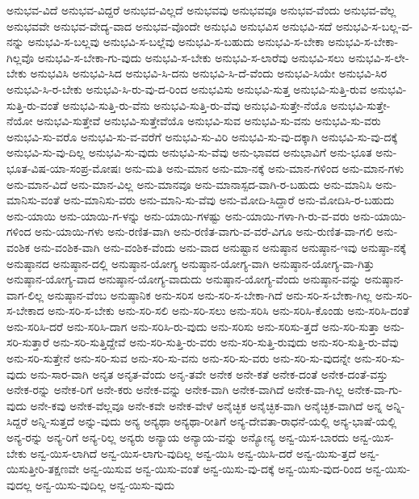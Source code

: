 {ಅನುಭವ-ವಿದೆ
ಅನುಭವ-ವಿದ್ದರೆ
ಅನುಭವ-ವಿಲ್ಲದೆ
ಅನುಭವವು
ಅನುಭವವೂ
ಅನುಭವ-ವೆಂದು
ಅನುಭವ-ವೆಲ್ಲ
ಅನುಭವವೇ
ಅನುಭವ-ವೇದ್ಯ-ವಾದ
ಅನುಭವ-ವೊಂದೇ
ಅನುಭವಿ
ಅನುಭವಿಸ
ಅನುಭವಿ-ಸದೆ
ಅನುಭವಿ-ಸ-ಬಲ್ಲ-ವ-ನನ್ನು
ಅನುಭವಿ-ಸ-ಬಲ್ಲವು
ಅನುಭವಿ-ಸ-ಬಲ್ಲೆವು
ಅನುಭವಿ-ಸ-ಬಹುದು
ಅನುಭವಿ-ಸ-ಬೇಕಾ
ಅನುಭವಿ-ಸ-ಬೇಕಾ-ಗಿಲ್ಲವೊ
ಅನುಭವಿ-ಸ-ಬೇಕಾ-ಗು-ವುದು
ಅನುಭವಿ-ಸ-ಬೇಕು
ಅನುಭವಿ-ಸ-ಲಾರೆವು
ಅನುಭವಿ-ಸಲು
ಅನುಭವಿ-ಸ-ಲೇ-ಬೇಕು
ಅನುಭವಿಸಿ
ಅನುಭವಿ-ಸಿದ
ಅನುಭವಿ-ಸಿ-ದನು
ಅನುಭವಿ-ಸಿ-ದೆ-ವೆಂದು
ಅನುಭವಿ-ಸಿಯೇ
ಅನುಭವಿ-ಸಿರ
ಅನುಭವಿ-ಸಿ-ರ-ಬೇಕು
ಅನುಭವಿ-ಸಿ-ರು-ವು-ದ-ರಿಂದ
ಅನುಭವಿಸು
ಅನುಭವಿ-ಸುತ್ತ
ಅನುಭವಿ-ಸುತ್ತಿ-ರುವ
ಅನುಭವಿ-ಸುತ್ತಿ-ರು-ವಂತೆ
ಅನುಭವಿ-ಸುತ್ತಿ-ರು-ವೆನು
ಅನುಭವಿ-ಸುತ್ತಿ-ರು-ವೆವು
ಅನುಭವಿ-ಸುತ್ತೇ-ನೆಯೊ
ಅನುಭವಿ-ಸುತ್ತೇ-ನೆಯೋ
ಅನುಭವಿ-ಸುತ್ತೇವೆ
ಅನುಭವಿ-ಸುತ್ತೇವೆಯೊ
ಅನುಭವಿ-ಸುವ
ಅನುಭವಿ-ಸು-ವನು
ಅನುಭವಿ-ಸು-ವರು
ಅನುಭವಿ-ಸು-ವರೊ
ಅನುಭವಿ-ಸು-ವ-ವರೆಗೆ
ಅನುಭವಿ-ಸು-ವಿರಿ
ಅನುಭವಿ-ಸು-ವು-ದಕ್ಕಾಗಿ
ಅನುಭವಿ-ಸು-ವು-ದಕ್ಕೆ
ಅನುಭವಿ-ಸು-ವು-ದಿಲ್ಲ
ಅನುಭವಿ-ಸು-ವುದು
ಅನುಭವಿ-ಸು-ವೆವು
ಅನು-ಭಾವದ
ಅನುಭಾವಿಗೆ
ಅನು-ಭೂತ
ಅನು-ಭೂತ-ವಿಷ-ಯಾ-ಸಂಪ್ರ-ಮೋಷಃ
ಅನು-ಮತಿ
ಅನು-ಮಾನ
ಅನು-ಮಾ-ನಕ್ಕೆ
ಅನು-ಮಾನ-ಗಳಿಂದ
ಅನು-ಮಾನ-ಗಳು
ಅನು-ಮಾನ-ವಿದೆ
ಅನು-ಮಾನ-ವಿಲ್ಲ
ಅನು-ಮಾನವೂ
ಅನು-ಮಾನಾಸ್ಪದ-ವಾಗಿ-ರ-ಬಹುದು
ಅನು-ಮಾನಿಸಿ
ಅನು-ಮಾನಿಸು-ವಂತೆ
ಅನು-ಮಾನಿಸು-ವರು
ಅನು-ಮಾನಿ-ಸು-ವೆವು
ಅನು-ಮೋದಿ-ಸಿದ್ದಾರೆ
ಅನು-ಮೋದಿಸಿ-ರ-ಬಹುದು
ಅನು-ಯಾಯಿ
ಅನು-ಯಾಯಿ-ಗ-ಳನ್ನು
ಅನು-ಯಾಯಿ-ಗಳಷ್ಟು
ಅನು-ಯಾಯಿ-ಗಳಾ-ಗಿ-ರು-ವ-ವರು
ಅನು-ಯಾಯಿ-ಗಳಿಂದ
ಅನು-ಯಾಯಿ-ಗಳು
ಅನು-ರಣಿತ-ವಾಗಿ
ಅನು-ರಣಿತ-ವಾಗು-ವ-ವರೆ-ವಿಗೂ
ಅನು-ರುಣಿತ-ವಾ-ಗಲಿ
ಅನು-ವಂಶಿಕ
ಅನು-ವಂಶಿಕ-ವಾಗಿ
ಅನು-ವಂಶಿಕ-ವೆಂದು
ಅನು-ವಾದ
ಅನುಷ್ಟಾನ
ಅನುಷ್ಠಾನ
ಅನುಷ್ಠಾನ-ಇವು
ಅನುಷ್ಠಾ-ನಕ್ಕೆ
ಅನುಷ್ಠಾನದ
ಅನುಷ್ಠಾನ-ದಲ್ಲಿ
ಅನುಷ್ಠಾನ-ಯೋಗ್ಯ
ಅನುಷ್ಠಾನ-ಯೋಗ್ಯ-ವಾಗಿ
ಅನುಷ್ಠಾನ-ಯೋಗ್ಯ-ವಾ-ಗಿತ್ತು
ಅನುಷ್ಠಾನ-ಯೋಗ್ಯ-ವಾದ
ಅನುಷ್ಠಾನ-ಯೋಗ್ಯ-ವಾದುದು
ಅನುಷ್ಠಾನ-ಯೋಗ್ಯ-ವೆಂದು
ಅನುಷ್ಠಾನ-ವನ್ನು
ಅನುಷ್ಠಾನ-ವಾಗ-ಲಿಲ್ಲ
ಅನುಷ್ಠಾನ-ವೆಂಬ
ಅನುಷ್ಠಾನಿಕ
ಅನು-ಸರಿಸ
ಅನು-ಸರಿ-ಸ-ಬೇಕಾ-ಗಿದೆ
ಅನು-ಸರಿ-ಸ-ಬೇಕಾ-ಗಿಲ್ಲ
ಅನು-ಸರಿ-ಸ-ಬೇಕಾದ
ಅನು-ಸರಿ-ಸ-ಬೇಕು
ಅನು-ಸರಿ-ಸಲಿ
ಅನು-ಸರಿ-ಸಲು
ಅನು-ಸರಿಸಿ
ಅನು-ಸರಿಸಿ-ಕೊಂಡು
ಅನು-ಸರಿಸಿ-ದಂತೆ
ಅನು-ಸರಿಸಿ-ದರೆ
ಅನು-ಸರಿಸಿ-ದಾಗ
ಅನು-ಸರಿಸಿ-ರು-ವುದು
ಅನು-ಸರಿಸು
ಅನು-ಸರಿಸು-ತ್ತದೆ
ಅನು-ಸರಿ-ಸುತ್ತಾ
ಅನು-ಸರಿ-ಸುತ್ತಾರೆ
ಅನು-ಸರಿ-ಸುತ್ತಿದ್ದೇವೆ
ಅನು-ಸರಿ-ಸುತ್ತಿ-ರು-ವರು
ಅನು-ಸರಿ-ಸುತ್ತಿ-ರುವುದು
ಅನು-ಸರಿ-ಸುತ್ತಿ-ರು-ವೆವು
ಅನು-ಸರಿ-ಸುತ್ತೇನೆ
ಅನು-ಸರಿ-ಸುವ
ಅನು-ಸರಿ-ಸು-ವನು
ಅನು-ಸರಿ-ಸು-ವರು
ಅನು-ಸರಿ-ಸು-ವುದನ್ನೇ
ಅನು-ಸರಿ-ಸು-ವುದು
ಅನು-ಸಾರ-ವಾಗಿ
ಅನೃತ
ಅನೃತ-ವೆಂದು
ಅನೃ-ತವೇ
ಅನೇಕ
ಅನೇ-ಕತೆ
ಅನೇಕ-ದಂತೆ
ಅನೇಕ-ದಂತೆ-ವಸ್ತು
ಅನೇಕ-ರನ್ನು
ಅನೇಕ-ರಿಗೆ
ಅನೇ-ಕರು
ಅನೇಕ-ವನ್ನು
ಅನೇಕ-ವಾಗಿ
ಅನೇಕ-ವಾಗಿದೆ
ಅನೇಕ-ವಾ-ಗಿಲ್ಲ
ಅನೇಕ-ವಾ-ಗು-ವುದು
ಅನೇ-ಕವು
ಅನೇಕ-ವೆಲ್ಲವೂ
ಅನೇ-ಕವೇ
ಅನೇಕ-ವೇಳೆ
ಅನೈಚ್ಛಿಕ
ಅನೈಚ್ಛಿಕ-ವಾಗಿ
ಅನೈಚ್ಛಿಕ-ವಾಗಿದೆ
ಅನ್ನ
ಅನ್ನಿ-ಸಿದ್ದರೆ
ಅನ್ನಿ-ಸುತ್ತದೆ
ಅನ್ನು-ವುದು
ಅನ್ಯ
ಅನ್ಯಥಾ
ಅನ್ಯಥಾ-ರೀತಿಗೆ
ಅನ್ಯ-ದೇವತಾ-ರಾಧನೆ-ಯಲ್ಲಿ
ಅನ್ಯ-ಭಾಷೆ-ಯಲ್ಲಿ
ಅನ್ಯ-ರನ್ನು
ಅನ್ಯ-ರಿಗೆ
ಅನ್ಯ-ರಿಲ್ಲ
ಅನ್ಯರು
ಅನ್ಯಾಯ
ಅನ್ಯಾಯ-ವನ್ನು
ಅನ್ಯೋನ್ಯ
ಅನ್ವ-ಯಿಸ-ಬಾರದು
ಅನ್ವ-ಯಿಸ-ಬೇಕು
ಅನ್ವ-ಯಿಸ-ಲಾಗಿದೆ
ಅನ್ವ-ಯಿಸ-ಲಾಗು-ವುದಿಲ್ಲ
ಅನ್ವ-ಯಿಸಿ
ಅನ್ವ-ಯಿಸಿ-ದರೆ
ಅನ್ವ-ಯಿಸು-ತ್ತದೆ
ಅನ್ವ-ಯಿಸುತ್ತೀರಿ-ತಕ್ಷಣವೇ
ಅನ್ವ-ಯಿಸುವ
ಅನ್ವ-ಯಿಸು-ವಂತೆ
ಅನ್ವ-ಯಿಸು-ವು-ದಕ್ಕೆ
ಅನ್ವ-ಯಿಸು-ವುದ-ರಿಂದ
ಅನ್ವ-ಯಿಸು-ವುದಲ್ಲ
ಅನ್ವ-ಯಿಸು-ವುದಿಲ್ಲ
ಅನ್ವ-ಯಿಸು-ವುದು
}
